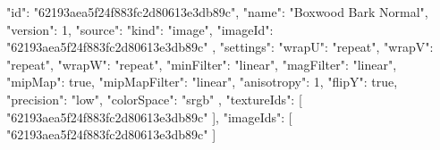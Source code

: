 {
  "id": "62193aea5f24f883fc2d80613e3db89c",
  "name": "Boxwood Bark Normal",
  "version": 1,
  "source": {
    "kind": "image",
    "imageId": "62193aea5f24f883fc2d80613e3db89c"
  },
  "settings": {
    "wrapU": "repeat",
    "wrapV": "repeat",
    "wrapW": "repeat",
    "minFilter": "linear",
    "magFilter": "linear",
    "mipMap": true,
    "mipMapFilter": "linear",
    "anisotropy": 1,
    "flipY": true,
    "precision": "low",
    "colorSpace": "srgb"
  },
  "textureIds": [
    "62193aea5f24f883fc2d80613e3db89c"
  ],
  "imageIds": [
    "62193aea5f24f883fc2d80613e3db89c"
  ]
}
